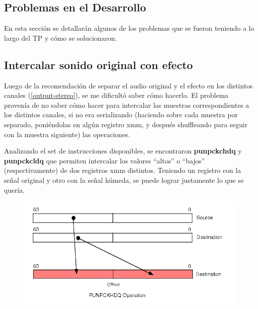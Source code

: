 \subsection{Problemas en el Desarrollo}
\label{subsec:desarrollo-problemas}

En esta sección se detallarán algunos de los problemas que se fueron teniendo a lo largo del TP y cómo se solucionaron.

\subsection{Intercalar sonido original con efecto}
\label{subsec:desarrollo-problemas-stereo-output}
Luego de la recomendación de separar el audio original y el efecto en los distintos canales (\ref{output-stereo}), se me dificultó saber cómo hacerlo. El problema provenía de no saber cómo hacer para intercalar las muestras correspondientes a los distintos canales, si no era serializando (haciendo sobre cada muestra por separado, poniéndolas en algún registro xmm, y después shuffleando para seguir con la muestra siguiente) las operaciones. 

Analizando el set de instrucciones disponibles, se encontraron \textbf{punpckchdq} y \textbf{punpckcldq} que permiten intercalar los valores ``altos'' o ``bajos'' (respectivamente) de dos registros xmm distintos. Teniendo un registro con la señal original y otro con la señal húmeda, se puede lograr justamente lo que se quería. \vspace{\baselineskip}


\begin{figure}[H]
    \centering
    \includegraphics[scale=0.75]{imagenes/punpckhdq.png}
    \label{fig:punpckhdq}
    \caption{}
\end{figure}

